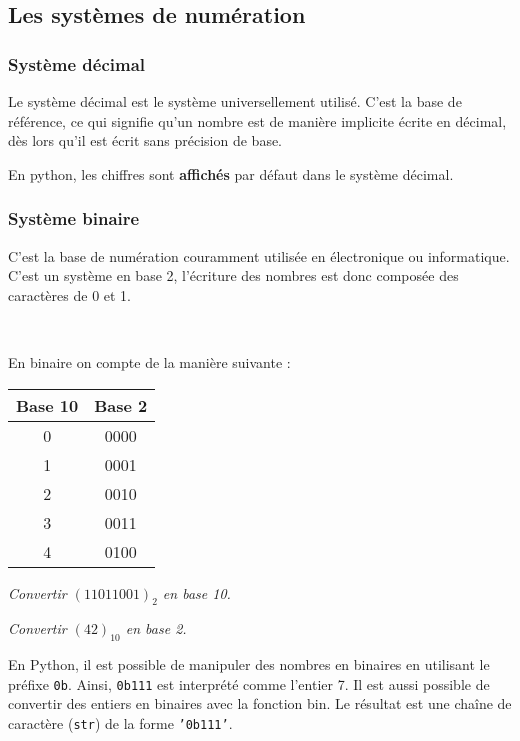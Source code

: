 \subsection{Les systèmes de numération}
\subsubsection{Système décimal}
Le système décimal est le système universellement utilisé. C'est la base de référence, ce qui signifie qu'un nombre est de manière implicite écrite en décimal, dès lors qu'il est écrit sans précision de base. 

En python, les chiffres sont \textbf{affichés} par défaut dans le système décimal. 

\subsubsection{Système binaire}

C'est la base de numération couramment utilisée en électronique ou informatique. C'est un système en base 2, l'écriture des nombres est donc composée des caractères de 0 et 1. 

\begin{exemple}~\\

\begin{minipage}[c]{.4\linewidth}
En binaire on compte de la manière suivante : 
\begin{center}
\begin{tabular}{|c|c|}
\hline
Base 10 & Base 2 \\
\hline \hline
0 & 0000 \\ \hline
1 & 0001 \\ \hline
2 & 0010 \\ \hline
3 & 0011 \\ \hline
4 & 0100 \\ \hline
\end{tabular}
\end{center}
\end{minipage} \hfill
\begin{minipage}{.57\linewidth}
\textit{Convertir $\left(11011001\right)_2$ en base 10.}

\textit{Convertir $\left(42\right)_{10}$ en base 2.}
\end{minipage}
\end{exemple}

En Python, il est possible de manipuler des nombres en binaires en utilisant le préfixe \texttt{0b}. Ainsi, \texttt{0b111} est interprété comme l'entier 7. 
Il est aussi possible de convertir des entiers en binaires avec la fonction bin. Le résultat est une chaîne de caractère (\texttt{str}) de la forme \texttt{'0b111'}.

